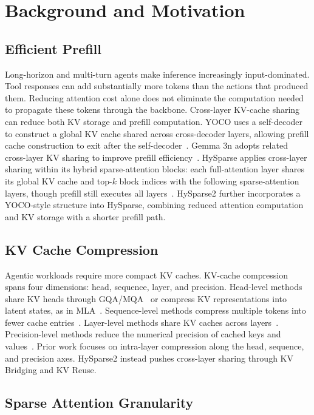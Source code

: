\section{Background and Motivation}

\subsection{Efficient Prefill}

Long-horizon and multi-turn agents make inference increasingly input-dominated.
Tool responses can add substantially more tokens than the actions that produced them.
Reducing attention cost alone does not eliminate the computation needed to propagate these tokens through the backbone.
Cross-layer KV-cache sharing can reduce both KV storage and prefill computation.
YOCO uses a self-decoder to construct a global KV cache shared across cross-decoder layers, allowing prefill cache construction to exit after the self-decoder~\citep{yoco}.
Gemma 3n adopts related cross-layer KV sharing to improve prefill efficiency~\citep{gemma3n}.
HySparse applies cross-layer sharing within its hybrid sparse-attention blocks: each full-attention layer shares its global KV cache and top-$k$ block indices with the following sparse-attention layers, though prefill still executes all layers~\citep{hysparse}.
HySparse2 further incorporates a YOCO-style structure into HySparse, combining reduced attention computation and KV storage with a shorter prefill path.

\subsection{KV Cache Compression}

Agentic workloads require more compact KV caches.
KV-cache compression spans four dimensions: head, sequence, layer, and precision.
Head-level methods share KV heads through GQA/MQA~\citep{gqa,mqa} or compress KV representations into latent states, as in MLA~\citep{deepseekv2}.
Sequence-level methods compress multiple tokens into fewer cache entries~\citep{deepseekv4}.
Layer-level methods share KV caches across layers~\citep{cla,yoco}.
Precision-level methods reduce the numerical precision of cached keys and values~\citep{liu2024kivi,hooper2024kvquant}.
Prior work focuses on intra-layer compression along the head, sequence, and precision axes.
HySparse2 instead pushes cross-layer sharing through KV Bridging and KV Reuse.

\subsection{Sparse Attention Granularity}

